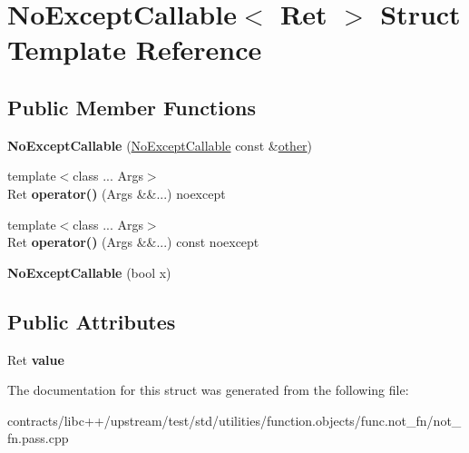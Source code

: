 \hypertarget{struct_no_except_callable}{}\section{No\+Except\+Callable$<$ Ret $>$ Struct Template Reference}
\label{struct_no_except_callable}
\subsection*{Public Member Functions}
\begin{DoxyCompactItemize}
\item 
\mbox{\label{struct_no_except_callable_a954e39ebd74692a2ee1a0a7ee62485e8}} 
{\bfseries No\+Except\+Callable} (\mbox{\hyperlink{struct_no_except_callable}{No\+Except\+Callable}} const \&\mbox{\hyperlink{structother}{other}})
\item 
\mbox{\label{struct_no_except_callable_a811bc06bdd8740d4744d0b3380e45d31}} 
{\footnotesize template$<$class ... Args$>$ }\\Ret {\bfseries operator()} (Args \&\&...) noexcept
\item 
\mbox{\label{struct_no_except_callable_ae0c64b36539e620e8668c5e17803c9f6}} 
{\footnotesize template$<$class ... Args$>$ }\\Ret {\bfseries operator()} (Args \&\&...) const noexcept
\item 
\mbox{\label{struct_no_except_callable_a25499cba3a779b48f04e8f0ebfbb1f5e}} 
{\bfseries No\+Except\+Callable} (bool x)
\end{DoxyCompactItemize}
\subsection*{Public Attributes}
\begin{DoxyCompactItemize}
\item 
\mbox{\label{struct_no_except_callable_a7bc71e16c43f69f642d88972f9d393d1}} 
Ret {\bfseries value}
\end{DoxyCompactItemize}


The documentation for this struct was generated from the following file\+:\begin{DoxyCompactItemize}
\item 
contracts/libc++/upstream/test/std/utilities/function.\+objects/func.\+not\+\_\+fn/not\+\_\+fn.\+pass.\+cpp\end{DoxyCompactItemize}
